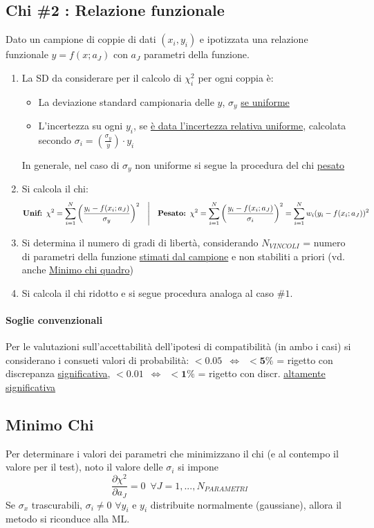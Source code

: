 \documentclass[11pt]{article}
\begin{document}
\subsection{Chi \#2 : Relazione funzionale}
Dato un campione di coppie di dati $(x_i, y_i)$ e ipotizzata una relazione funzionale $y = f(x; a_J)$ con $a_J$ parametri della funzione.
\begin{enumerate}
\item La SD da considerare per il calcolo di $\chi^2_i$ per ogni coppia è:
\begin{itemize}[label=$\ast$]
    \item La deviazione standard campionaria delle $y$, $\sigma_y$ \underline{se uniforme}
    \item L'incertezza su ogni $y_i$, se \underline{è data l'incertezza relativa uniforme}, calcolata secondo $\sigma_i = (\frac{\sigma_y}{y}) \cdot y_i$
\end{itemize}
In generale, nel caso di $\sigma_y$ non uniforme si segue la procedura del chi \underline{pesato}

\item Si calcola il chi:
\[\textrm{\textbf{Unif: }} \chi^2 = \sum \limits_{i = 1}^{N} \bigg(\frac{y_i - f(x_i; a_J)}{\sigma_y}\bigg)^2 \quad \Bigg| \quad \textrm{\textbf{Pesato: }} \chi^2 = \sum \limits_{i = 1}^{N} \bigg(\frac{y_i - f(x_i; a_J)}{\sigma_i}\bigg)^2 = \sum \limits_{i = 1}^{N} w_i (y_i - f(x_i; a_J))^2\]

\item Si determina il numero di gradi di libertà, considerando $N_{VINCOLI}$ = numero di parametri della funzione \underline{stimati dal campione} e non stabiliti a priori (vd. anche \underline{Minimo chi quadro})

\item Si calcola il chi ridotto e si segue procedura analoga al caso $\#1$.
\end{enumerate}
\paragraph{Soglie convenzionali} Per le valutazioni sull'accettabilità dell'ipotesi di compatibilità (in ambo i casi) si considerano i consueti valori di probabilità: $\mathbf{< 0.05 \enspace \Leftrightarrow \enspace < 5\%}$ = rigetto con discrepanza \underline{significativa}, $\mathbf{< 0.01 \enspace \Leftrightarrow \enspace < 1\%}$ = rigetto con discr. \underline{\underline{altamente significativa}}

\subsection{Minimo Chi}
Per determinare i valori dei parametri che minimizzano il chi (e al contempo il valore per il test), noto il valore delle $\sigma_i$ si impone
\[\frac{\partial \chi^2}{\partial a_J} = 0 \enspace \forall J = 1, ..., N_{PARAMETRI}\]
Se $\sigma_x$ trascurabili, $\sigma_i \neq 0$ $\forall y_i$ e $y_i$ distribuite normalmente (gaussiane), allora il metodo si riconduce alla ML.
\end{document}
